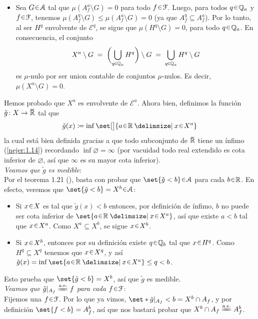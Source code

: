 \begin{sol}
\begin{itemize}[leftmargin=1em]
\item
Sea $G\en\mathcal{A}$ tal que $\mu(A^a_f \setminus G) = 0$ para todo $f\en\mathcal{F}$. Luego, para todos $q\en\mathbb{Q}_a$ y $f\en\mathcal{F}$, tenemos $\mu(A^q_f\setminus G) \leq \mu(A^a_f\setminus G) = 0$ (ya que $A^q_f \subseteq A^a_f$). Por lo tanto, al ser $H^q$ envolvente de $\mathcal{E}^q$, se sigue que $\mu(H^q \setminus G) = 0$, para todo $q\en\mathbb{Q}_a$. En consecuencia, el conjunto
\[
X^a \setminus G 
\;=\; \biggl(\bigcup_{q\en\mathbb{Q}_a}H^q \biggr) \setminus G
\;=\; \bigcup_{q\en\mathbb{Q}_a}H^q\setminus G
\]
es $\mu$-nulo por ser union contable de conjuntos $\mu$-nulos. Es decir, $\mu(X^a \setminus G) = 0$.
\end{itemize}
Hemos probado que $X^a$ es envolvente de $\mathcal{E}^a$. Ahora bien, definimos la función $\tilde{g} \colon X \to \ubar{\mathbb{R}}$ tal que
\[
\tilde{g}(x) \coloneq \inf\set[\big]{a\en\mathbb{R} \given x \en X^a}
\]
la cual está bien definida gracias a que todo subconjunto de $\ubar{\mathbb{R}}$ tiene un ínfimo (\cref{nejer:1.14}) recordando $\inf\varnothing = \infty$ (por vacuidad todo real extendido es cota inferior de $\varnothing$, así que $\infty$ es su mayor cota inferior).\vspace{1em}\\
\emph{Veamos que $\tilde{g}$ es medible}:\\
Por el teorema 1.21 (\cite[\S 1.2]{Salamon}), basta con probar que $\set{\tilde{g} < b}\en\mathcal{A}$ para cada $b\en\mathbb{R}$. En efecto, veremos que $\set{\tilde{g}<b} = X^b \en \mathcal{A}$:
\begin{itemize}[leftmargin=1.8em]
\item[($\subseteq$)]Si $x\en X$ es tal que $\tilde{g}(x) < b$ entonces, por definición de ínfimo, $b$ no puede ser cota inferior de $\set{a\en\mathbb{R} \given x \en X^a}$, así que existe $a<b$ tal que $x \en X^a$. Como $X^a \subseteq X^b$, se sigue $x\en X^b$.
\item[($\supseteq$)]Si $x\en X^b$, entonces por su definición existe $q\en\mathbb{Q}_b$ tal que $x\en H^q$. Como $H^q \subseteq X^q$ tenemos que $x\en X^q$, y así $\tilde{g}(x) = \inf\set{a\en\mathbb{R} \given x \en X^a} \leq q < b$.
\end{itemize}
Esto prueba que $\set{\tilde{g} < b} = X^b$, así que $\tilde{g}$ es medible.\vspace{1em}\\
\emph{Veamos que $\tilde{g}|_{A_f} \ctpeq f$ para cada $f\en\mathcal{F}$}:\\
Fijemos una $f\en\mathcal{F}$. Por lo que ya vimos, $\set*{\tilde{g}|_{A_f} < b} = X^b \cap A_f$, y por definición $\set{f < b} = A^b_f$, así que nos bastará probar que $X^b \cap A_f \ctpeq A^b_f$.%

\end{sol}
